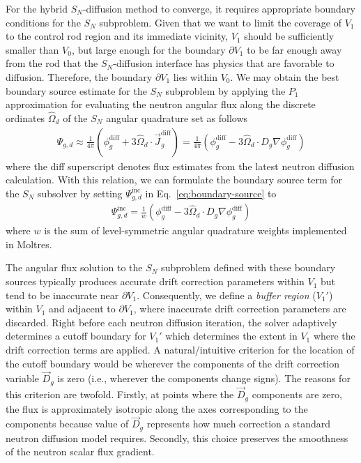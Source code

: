 \documentclass[letterpaper]{mc2025}
\begin{document}
For the hybrid $S_N$-diffusion method to converge, it requires appropriate boundary conditions for
the $S_N$ subproblem. Given that we want to limit the coverage of $V_1$ to the control rod region
and its immediate vicinity, $V_1$ should be sufficiently smaller than $V_0$, but large enough for
the boundary $\partial V_1$ to be far enough away from the rod that the $S_N$-diffusion interface
has physics that are favorable to diffusion. Therefore, the boundary $\partial V_1$ 
lies within $V_0$. We may obtain the best boundary source estimate for the $S_N$ subproblem by
applying the $P_1$ approximation for evaluating the neutron angular flux along
the discrete ordinates $\hat{\Omega}_d$ of the $S_N$ angular quadrature set as follows
%
\begin{align}
  \Psi_{g,d} \approx \frac{1}{4\pi}\left(\phi^\text{diff}_g+3\hat{\Omega}_d\cdot
  \vec{J}^\text{diff}_g\right)
  =\frac{1}{4\pi}\left(\phi^\text{diff}_g-3\hat{\Omega}_d\cdot D_g\nabla\phi^\text{diff}_g\right)
\end{align}
%
where the diff superscript denotes flux estimates from the latest neutron diffusion calculation.
With this relation, we can formulate the boundary source term for the $S_N$ subsolver by setting
$\Psi^\text{inc}_{g,d}$ in Eq.\ \ref{eq:boundary-source} to
%
\begin{gather}
  \Psi^\text{inc}_{g,d} = \frac{1}{w}
  \left(\phi^\text{diff}_g-3\hat{\Omega}_d\cdot D_g\nabla\phi^\text{diff}_g\right)
\end{gather}
%
where $w$ is the sum of level-symmetric angular quadrature weights implemented in Moltres.

The angular flux solution to the $S_N$ subproblem defined with these boundary sources typically
produces accurate drift correction parameters within $V_1$ but tend to be inaccurate
near $\partial V_1$. Consequently, we define a \textit{buffer region} ($V_1'$) within $V_1$
and adjacent to $\partial V_1$, where inaccurate drift correction parameters are
discarded. Right before each
neutron diffusion iteration, the solver adaptively determines a cutoff boundary for $V_1'$ which
determines the extent in $V_1$ where the drift correction terms are applied.
A natural/intuitive criterion for the location of the cutoff boundary
would be wherever the components of the drift correction variable $\vec{D}_g$ is zero (i.e.,
wherever the components change signs). The reasons for this criterion are twofold. Firstly, at
points where the $\vec{D}_g$ components are zero, the flux is approximately isotropic along the
axes corresponding to the components because value of $\vec{D}_g$ represents how much correction a
standard neutron diffusion model requires. Secondly, this choice preserves the smoothness of the
neutron scalar flux gradient.
\end{document}
